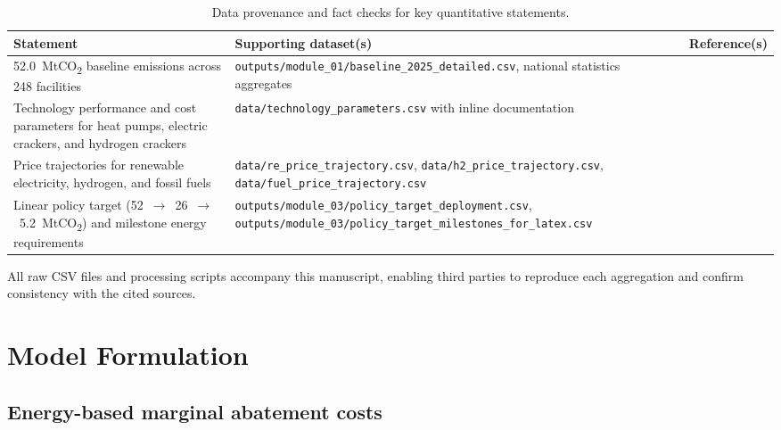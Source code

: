 \documentclass[12pt,a4paper]{article}
\begin{document}
\begin{table}[htbp]
    \centering
    \caption{Data provenance and fact checks for key quantitative statements.}
    \label{tab:data_provenance}
    \begin{tabular}{p{}p{}p{}}
        \toprule
        \textbf{Statement} & \textbf{Supporting dataset(s)} & \textbf{Reference(s)} \\
        \midrule
        52.0~MtCO\textsubscript{2} baseline emissions across 248 facilities & \texttt{outputs/module\_01/baseline\_2025\_detailed.csv}, national statistics aggregates & \citet{KEEI2023} \\
        Technology performance and cost parameters for heat pumps, electric crackers, and hydrogen crackers & \texttt{data/technology\_parameters.csv} with inline documentation & \citet{Arpagaus2018,Sadler2020,Woo2025,Zhang2023} \\
        Price trajectories for renewable electricity, hydrogen, and fossil fuels & \texttt{data/re\_price\_trajectory.csv}, \texttt{data/h2\_price\_trajectory.csv}, \texttt{data/fuel\_price\_trajectory.csv} & \citet{IRENA2023,HydrogenCouncil2021,KEEI2023} \\
        Linear policy target (52~$\rightarrow$~26~$\rightarrow$~5.2~MtCO\textsubscript{2}) and milestone energy requirements & \texttt{outputs/module\_03/policy\_target\_deployment.csv}, \texttt{outputs/module\_03/policy\_target\_milestones\_for\_latex.csv} & \citet{Korea10thPlan,IEA2021NetZero} \\
        \bottomrule
    \end{tabular}
\end{table}

All raw CSV files and processing scripts accompany this manuscript, enabling third parties to reproduce each aggregation and confirm consistency with the cited sources.

\section{Model Formulation}
\label{sec:model}

\subsection{Energy-based marginal abatement costs}
\end{document}
